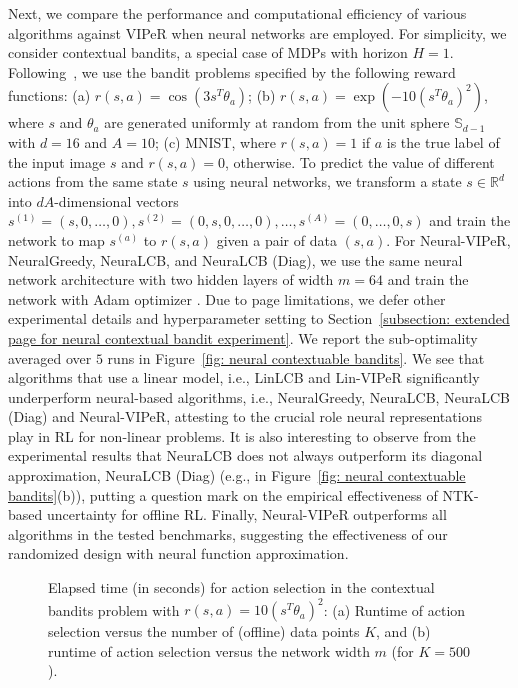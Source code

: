 \documentclass{article} \usepackage{iclr2023/iclr2023_conference,times}
\begin{document}
Next, we compare the performance and computational efficiency of various algorithms against VIPeR when neural networks are employed. For simplicity, we consider contextual bandits, a special case of MDPs with horizon $H = 1$. 
Following~\cite{zhou2020neural, nguyen2021offline}, we use the bandit problems specified by the following reward functions: (a) $r(s, a) = \cos(3 s^T \theta_a)$; (b) $r(s, a) = \exp(-10 (s^T \theta_a)^2)$, where $s$ and $\theta_a$ are generated uniformly at random from the unit sphere $\mathbb{S}_{d-1}$ with $d = 16$ and $A = 10$; (c) MNIST, where $r(s, a) = 1$ if $a$ is the true label of the input image $s$ and $r(s, a) = 0$, otherwise. To predict the value of different actions from the same state $s$ using neural networks, we transform a state $s \in \mathbb{R}^d$ into $d A$-dimensional vectors $s^{(1)} = (s, 0, \ldots, 0), s^{(2)} = (0, s, 0, \ldots, 0), \ldots, s^{(A)} = (0, \ldots, 0, s)$ and train the network to map $s^{(a)}$ to $r(s, a)$ given a pair of data $(s, a)$. For Neural-VIPeR, NeuralGreedy, NeuraLCB, and NeuraLCB (Diag), we use the same neural network architecture with two hidden layers of width $m = 64$ and train the network with Adam optimizer \citep{kingma2014adam}. Due to page limitations, we defer other experimental details and hyperparameter setting to Section~\ref{subsection: extended page for neural contextual bandit experiment}. We report the sub-optimality averaged over $5$ runs in Figure~\ref{fig: neural contextuable bandits}. We see that algorithms that use a linear model, i.e., LinLCB and Lin-VIPeR significantly underperform neural-based algorithms, i.e., NeuralGreedy, NeuraLCB, NeuraLCB (Diag) and Neural-VIPeR, attesting to the crucial role neural representations play in RL for non-linear problems. It is also interesting to observe from the experimental results that NeuraLCB does not always outperform its diagonal approximation, NeuraLCB (Diag) (e.g., in Figure~\ref{fig: neural contextuable bandits}(b)), putting a question mark on the empirical effectiveness of NTK-based uncertainty for offline RL. Finally, Neural-VIPeR outperforms all algorithms in the tested benchmarks, suggesting the effectiveness of our randomized design with neural function approximation. 





\begin{figure}[h]
    \vspace{-10pt}
    \centering
    \vspace{-10pt}
    \caption{Elapsed time (in seconds) for action selection in the contextual bandits problem with $r(s,a) = 10 (s^T \theta_a)^2$: (a) Runtime of action selection versus the number of (offline) data points $K$, and (b) runtime of action selection versus the network width $m$ (for $K = 500$).}
    \label{fig: time for action selection}
    \vspace{-8pt}
\end{figure}
\end{document}
